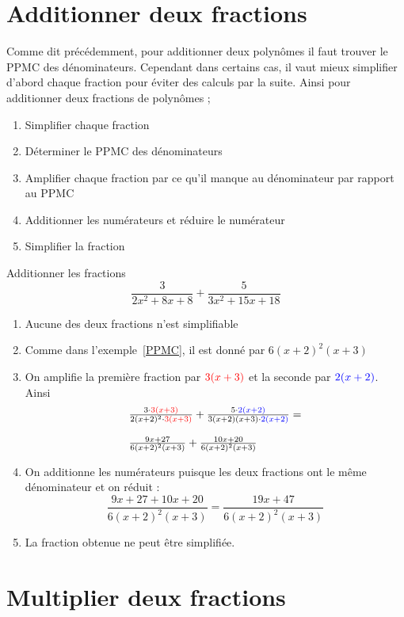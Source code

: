 \section{Additionner deux fractions}

Comme dit précédemment, pour additionner deux polynômes il faut trouver le PPMC des dénominateurs. Cependant dans certains cas, il vaut mieux simplifier d'abord chaque fraction pour éviter des calculs par la suite. Ainsi pour additionner deux fractions de polynômes ;
\begin{enumerate}
\item Simplifier chaque fraction
\item Déterminer le PPMC des dénominateurs
\item Amplifier chaque fraction par ce qu'il manque au dénominateur par rapport au PPMC
\item Additionner les numérateurs et réduire le numérateur
\item Simplifier la fraction
\end{enumerate}

\begin{exemple}
Additionner les fractions
$$
\frac{3}{2x^2 +8x + 8} + \frac{5}{3x^2 + 15x + 18}
$$
\begin{enumerate}
\item Aucune des deux fractions n'est simplifiable
\item Comme dans l'exemple~\ref{PPMC}, il est donné par $6(x+2)^2 (x+3)$
\item On amplifie la première fraction par $\textcolor{red}{3(x+3)}$ et la seconde par $\textcolor{blue}{2(x+2)}$. Ainsi
$$
\begin{array}{l}
\frac{3 \cdot  \textcolor{red}{3(x+3)}}{2(x+2)^2 \cdot  \textcolor{red}{3(x+3)}} + \frac{5\cdot  \textcolor{blue}{2(x+2)}}{3(x+2)(x+3) \cdot \textcolor{blue}{2(x+2)}}
=\\
\\
\frac{9x+27}{6(x+2)^2 (x+3)} + \frac{10x + 20}{6(x+2)^2 (x+3)}
\end{array}
$$
\item On additionne les numérateurs puisque les deux fractions ont le même dénominateur et on réduit :
$$
\frac{9x+27 + 10x + 20}{6(x+2)^2 (x+3)} = \frac{19x + 47}{6(x+2)^2 (x+3)}
$$
\item La fraction obtenue ne peut être simplifiée.
\end{enumerate}
\end{exemple}

\section{Multiplier deux fractions}

